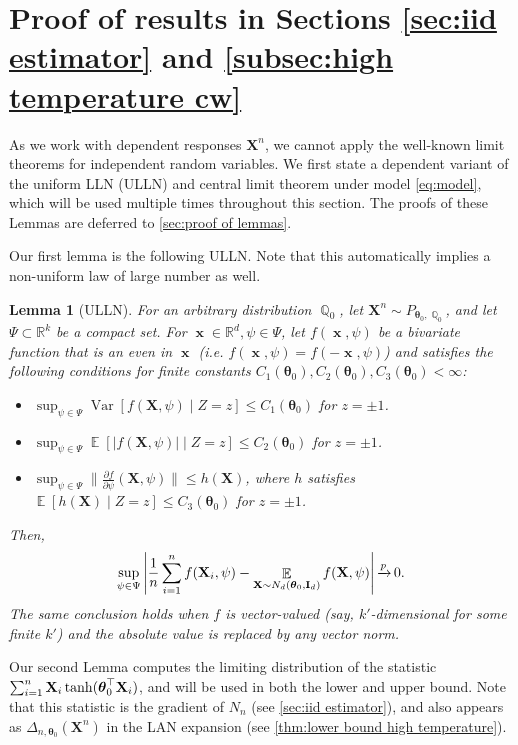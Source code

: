 \documentclass[preprint,reqno]{imsart}
\newtheorem{lemma}[thm]{Lemma}
\newcommand{\ttheta}{\boldsymbol{\theta}}
\newcommand{\I}{\mathbf{I}_{\mathnormal{d}}}
\DeclareMathOperator{\bx}{\textbf{x}}
\DeclareMathOperator{\xp}{\xrightarrow{\mathnormal p}}
\DeclareMathOperator{\EE}{\mathbb{E}}
\DeclareMathOperator{\Var}{Var}
\DeclareMathOperator{\QQ}{\mathbb{Q}}
\newcommand{\X}{\mathbf{X}}
\DeclareMathOperator{\sumin}{\sum_{\mathnormal i=1}^{\mathnormal n}}
\begin{document}
\section{Proof of results in Sections \ref{sec:iid estimator} and \ref{subsec:high temperature cw}}\label{sec:proof main paper}

%
As we work with dependent responses $\X^n$, we cannot apply the well-known limit theorems for independent random variables.
We first state a dependent variant of the uniform LLN (ULLN) and central limit theorem under model \eqref{eq:model}, which will be used multiple times throughout this section. The proofs of these Lemmas are deferred to \cref{sec:proof of lemmas}. 

Our first lemma is the following ULLN. Note that this automatically implies a non-uniform law of large number as well.

\begin{lemma}[ULLN]\label{lem:ULLN high}
%
For an arbitrary distribution $\QQ_0$, let $\X^n \sim P_{\ttheta_0, \QQ_0}$, and let $\Psi \subset \mathbb{R}^k$ be a compact set.
For $\bx \in \mathbb{R}^d, \psi \in \Psi$, let $f(\bx, \psi)$ be a bivariate function that is an even in $\bx$ (i.e. $f(\bx, \psi) = f(-\bx, \psi)$) and satisfies the following conditions for finite constants $C_1(\ttheta_0), C_2(\ttheta_0), C_3(\ttheta_0) < \infty$:
\begin{itemize}
    \item $\sup_{\psi \in \Psi} \Var [f(\X, \psi) \mid Z = z] \le C_1(\ttheta_0)$ for $z = \pm 1$. 
    \item $\sup_{\psi \in \Psi} \EE [ | f(\X, \psi)| \mid Z = z] \le C_2(\ttheta_0)$ for $z = \pm 1$.
    \item $\sup_{\psi \in \Psi} \lVert \frac{\partial f}{\partial \psi} (\X, \psi) \rVert \le h(\X)$, where $h$ satisfies $\EE [h(\X) \mid Z = z] \le C_3(\ttheta_0)$ for $z = \pm 1$.
\end{itemize}
Then, 
    \begin{equation*}
        \sup_{\psi \in \Psi} \left| \frac{1}{n} \sumin f(\X_i, \psi) - \EE_{\X \sim N_d(\ttheta_0, \I)} f(\X, \psi) \right| \xp 0.
    \end{equation*}
    The same conclusion holds when $f$ is vector-valued (say, $k'$-dimensional for some finite $k'$) and the absolute value is replaced by any vector norm.
\end{lemma}

Our second Lemma computes the limiting distribution of the statistic $\sumin \X_i \tanh(\ttheta_0^\top \X_i)$, and will be used in both the lower and upper bound. Note that this statistic is the gradient of $N_n$ (see \cref{sec:iid estimator}), and also appears as $\Delta_{n,\ttheta_0}(\X^n)$ in the LAN expansion (see \cref{thm:lower bound high temperature}).
%
\end{document}
